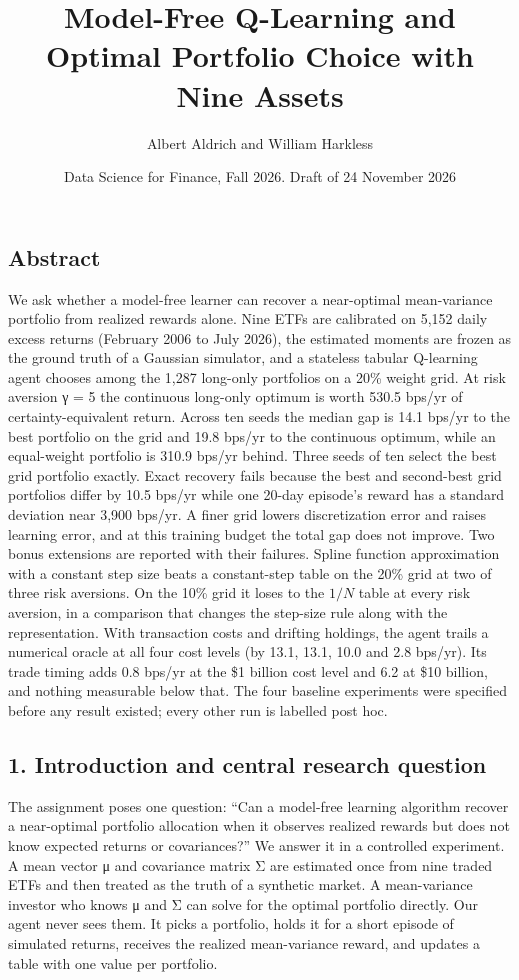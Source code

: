 \documentclass[
  11pt]{article}
\title{Model-Free Q-Learning and Optimal Portfolio Choice with Nine
Assets}
\author{Albert Aldrich and William Harkless}
\date{Data Science for Finance, Fall 2026. Draft of 24 November 2026}
\begin{document}
\maketitle

\subsection{Abstract}\label{abstract}

We ask whether a model-free learner can recover a near-optimal
mean-variance portfolio from realized rewards alone. Nine ETFs are
calibrated on 5,152 daily excess returns (February 2006 to July 2026),
the estimated moments are frozen as the ground truth of a Gaussian
simulator, and a stateless tabular Q-learning agent chooses among the
1,287 long-only portfolios on a 20\% weight grid. At risk aversion γ = 5
the continuous long-only optimum is worth 530.5 bps/yr of
certainty-equivalent return. Across ten seeds the median gap is 14.1
bps/yr to the best portfolio on the grid and 19.8 bps/yr to the
continuous optimum, while an equal-weight portfolio is 310.9 bps/yr
behind. Three seeds of ten select the best grid portfolio exactly. Exact
recovery fails because the best and second-best grid portfolios differ
by 10.5 bps/yr while one 20-day episode's reward has a standard
deviation near 3,900 bps/yr. A finer grid lowers discretization error
and raises learning error, and at this training budget the total gap
does not improve. Two bonus extensions are reported with their failures.
Spline function approximation with a constant step size beats a
constant-step table on the 20\% grid at two of three risk aversions. On
the 10\% grid it loses to the \(1/N\) table at every risk aversion, in a
comparison that changes the step-size rule along with the
representation. With transaction costs and drifting holdings, the agent
trails a numerical oracle at all four cost levels (by 13.1, 13.1, 10.0
and 2.8 bps/yr). Its trade timing adds 0.8 bps/yr at the \$1 billion
cost level and 6.2 at \$10 billion, and nothing measurable below that.
The four baseline experiments were specified before any result existed;
every other run is labelled post hoc.

\subsection{1. Introduction and central research
question}\label{introduction-and-central-research-question}

The assignment poses one question: ``Can a model-free learning algorithm
recover a near-optimal portfolio allocation when it observes realized
rewards but does not know expected returns or covariances?'' We answer
it in a controlled experiment. A mean vector μ and covariance matrix Σ
are estimated once from nine traded ETFs and then treated as the truth
of a synthetic market. A mean-variance investor who knows μ and Σ can
solve for the optimal portfolio directly. Our agent never sees them. It
picks a portfolio, holds it for a short episode of simulated returns,
receives the realized mean-variance reward, and updates a table with one
value per portfolio.
\end{document}
